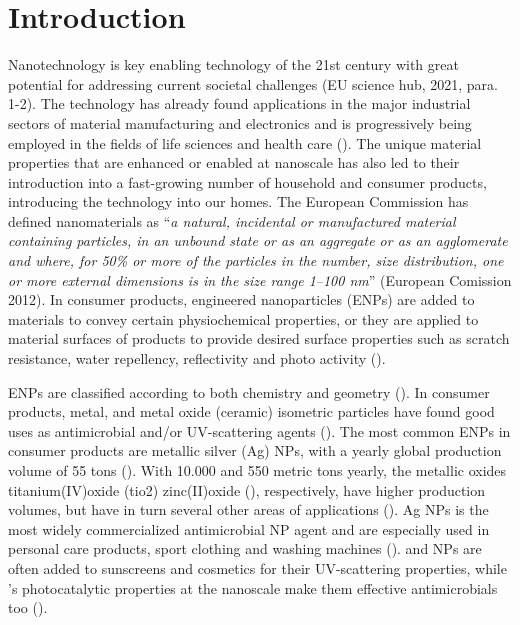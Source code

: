 \chapter{Introduction}

Nanotechnology is key enabling technology of the 21st century with great potential for addressing current societal challenges (EU science hub, 2021, para. 1-2). The technology has already found applications in the major industrial sectors of material manufacturing and electronics and is progressively being employed in the fields of life sciences and health care (\cite{Talebian2021}). The unique material properties that are enhanced or enabled at nanoscale has also led to their introduction into a fast-growing number of household and consumer products, introducing the technology into our homes. The European Commission has defined nanomaterials as “\emph{a natural, incidental or manufactured material containing particles, in an unbound state or as an aggregate or as an agglomerate and where, for 50\% or more of the particles in the number, size distribution, one or more external dimensions is in the size range 1–100 nm}” (European Comission 2012). In consumer products, engineered nanoparticles (ENPs) are added to materials to convey certain physiochemical properties, or they are applied to material surfaces of products to provide desired surface properties such as scratch resistance, water repellency, reflectivity and photo activity (\cite{Bodarenko2013, Weir2012}).

\acrshort{ENPs} are classified according to both chemistry and geometry (\cite{Warheit2018}). In consumer products, metal, and metal oxide (ceramic) isometric particles have found good uses as antimicrobial and/or UV-scattering agents (\cite{Bodarenko2013}). The most common \acrshort{ENPs} in consumer products are metallic silver (\acrshort{Ag}) NPs, with a yearly global production volume of 55 tons (\cite{Piccinno2012}). With 10.000 and 550 metric tons yearly, the metallic oxides titanium(IV)oxide (\acrshort{tio2}) zinc(II)oxide (), respectively, have higher production volumes, but have in turn several other areas of applications (\cite{Piccinno2012, Bodarenko2013}). \acrshort{Ag} NPs is the most widely commercialized antimicrobial NP agent and are especially used in personal care products, sport clothing and washing machines (\cite{Bodarenko2013, Farkas2011}).  and  NPs are often added to sunscreens and cosmetics for their UV-scattering properties, while {}'s photocatalytic properties at the nanoscale make them effective antimicrobials too (\cite{Bodarenko2013, Weir2012}).

